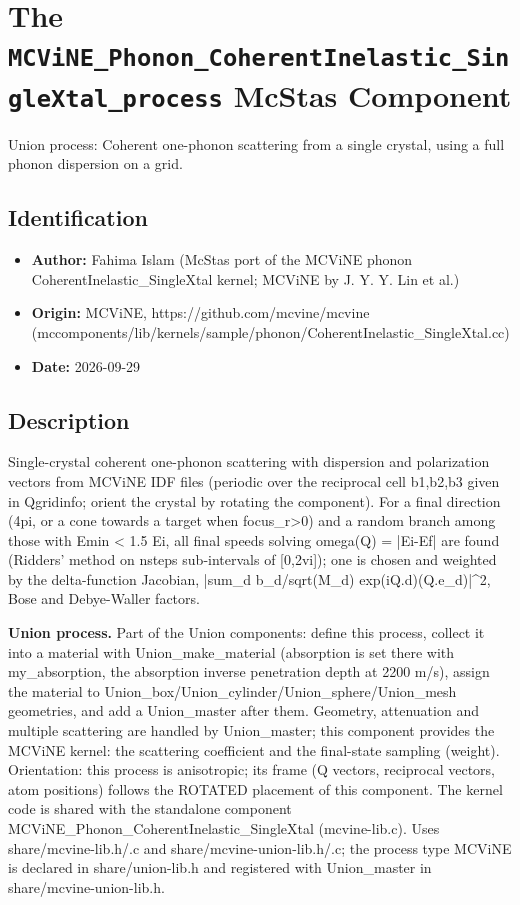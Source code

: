 \section{The \texttt{MCViNE\_Phonon\_CoherentInelastic\_SingleXtal\_process} McStas Component}
Union process: Coherent one-phonon scattering from a single crystal, using a full phonon dispersion on a grid.

\subsection*{Identification}
\begin{itemize}
  \item \textbf{Author:} Fahima Islam (McStas port of the MCViNE phonon CoherentInelastic\_SingleXtal kernel; MCViNE by J. Y. Y. Lin et al.)
  \item \textbf{Origin:} MCViNE, https://github.com/mcvine/mcvine (mccomponents/lib/kernels/sample/phonon/CoherentInelastic\_SingleXtal.cc)
  \item \textbf{Date:} 2026-09-29
\end{itemize}

\subsection*{Description}
Single-crystal coherent one-phonon scattering with dispersion and polarization vectors from MCViNE IDF files (periodic over the reciprocal cell b1,b2,b3 given in Qgridinfo; orient the crystal by rotating the component). For a final direction (4pi, or a cone towards a target when focus\_r\textgreater{}0) and a random branch among those with Emin \textless{} 1.5 Ei, all final speeds solving omega(Q) = |Ei-Ef| are found (Ridders' method on nsteps sub-intervals of [0,2vi]); one is chosen and weighted by the delta-function Jacobian, |sum\_d b\_d/sqrt(M\_d) exp(iQ.d)(Q.e\_d)|\textasciicircum{}2, Bose and Debye-Waller factors.

\textbf{Union process.} Part of the Union components: define this process, collect it into a material with Union\_make\_material (absorption is set there with my\_absorption, the absorption inverse penetration depth at 2200 m/s), assign the material to Union\_box/Union\_cylinder/Union\_sphere/Union\_mesh geometries, and add a Union\_master after them. Geometry, attenuation and multiple scattering are handled by Union\_master; this component provides the MCViNE kernel: the scattering coefficient and the final-state sampling (weight). Orientation: this process is anisotropic; its frame (Q vectors, reciprocal vectors, atom positions) follows the ROTATED placement of this component. The kernel code is shared with the standalone component MCViNE\_Phonon\_CoherentInelastic\_SingleXtal (mcvine-lib.c). Uses share/mcvine-lib.h/.c and share/mcvine-union-lib.h/.c; the process type MCViNE is declared in share/union-lib.h and registered with Union\_master in share/mcvine-union-lib.h.

